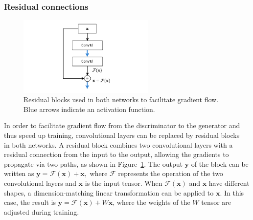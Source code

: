 



\subsubsection{Residual connections}
\begin{figure}
    \centering
    \includegraphics[width=0.6\textwidth]{chapter4/residual_sel.drawio.pdf}
    \caption{Residual blocks used in both networks to facilitate gradient flow.
    Blue arrows indicate an activation function.}
    \label{fig:residual_block}
\end{figure}
In order to facilitate gradient flow from the discriminator to the generator and
thus speed up training, convolutional layers can be replaced by residual
blocks~\cite{he2016deep} in both networks. A residual block combines two
convolutional layers with a residual connection from the input to the output,
allowing the gradients to propagate via two paths, as shown in
Figure~\ref{fig:residual_block}. The output $\bm{y}$ of the block can be
written as
    $\bm{y} = \mathcal{F}(\bm{x}) + \bm{x},$
where $\mathcal{F}$ represents the operation of the two convolutional layers and
$\bm{x}$ is the input tensor. 
When $\mathcal{F}(\bm{x})$ and $\bm{x}$ have different shapes, a
dimension-matching linear transformation can be applied to $\bm{x}$. In this
case, the result is $\bm{y} = \mathcal{F}(\bm{x}) + W \bm{x}$, where the
weights of the $W$ tensor are adjusted during training.


